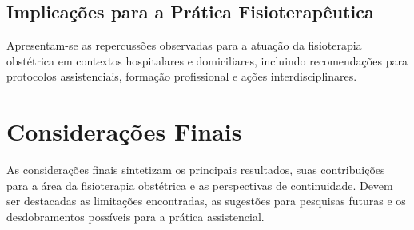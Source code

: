 \documentclass[openright]{tex/estilos/normas-utf-tex}
\begin{document}
\section{Implicações para a Prática Fisioterapêutica}
\label{sec:implicacoes-pratica}

Apresentam-se as repercussões observadas para a atuação da fisioterapia obstétrica em contextos hospitalares e domiciliares, incluindo recomendações para protocolos assistenciais, formação profissional e ações interdisciplinares.

\chapter{Considerações Finais}
\label{chap:consideracoes-finais}

As considerações finais sintetizam os principais resultados, suas contribuições para a área da fisioterapia obstétrica e as perspectivas de continuidade. Devem ser destacadas as limitações encontradas, as sugestões para pesquisas futuras e os desdobramentos possíveis para a prática assistencial.


\end{document}

